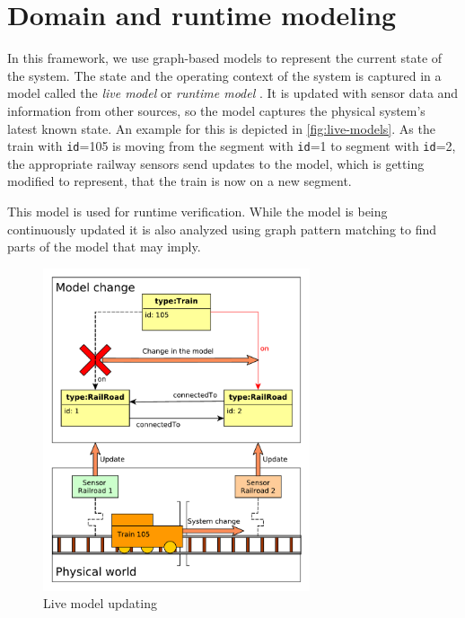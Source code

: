 \section{Domain and runtime modeling}

In this framework, we use graph-based models to represent the current state of the system. 
The state and the operating context of the system is captured in a model called the \emph{live model} or \emph{runtime model} \cite{Szvetits2013, DBLP:journals/computer/BlairBF09}.
It is updated with sensor data and information from other sources, so the model captures the physical system's latest known state.
An example for this is depicted in \autoref{fig:live-models}. As the train with \texttt{id}=105 is moving from the segment with \texttt{id}=1 to segment with \texttt{id}=2, the appropriate railway sensors send updates to the model, which is getting modified to represent, that the train is now on a new segment.


This model is used for runtime verification.
While the model is being continuously updated it is also analyzed using graph pattern matching to find parts of the model that may imply.


\begin{figure}[H]
	\begin{center}
		\includegraphics[width=0.7\textwidth]{figures/live-models.pdf}
		\caption{Live model updating}
		\label{fig:live-models}
	\end{center}
\end{figure}

